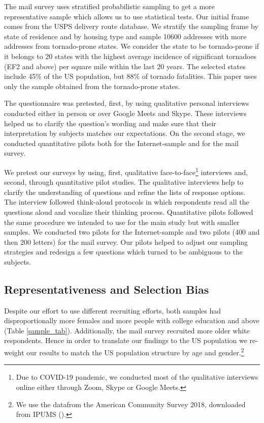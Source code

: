 \documentclass{ametsocV6.1}
\begin{document}
\label{sample_tab}

The mail survey uses stratified probabilistic sampling to get a more representative sample which allows us to use statistical tests. Our initial frame comes from the USPS delivery route database. We stratify the sampling frame by state of residence and by housing type and sample 10600 addresses with more addresses from tornado-prone states. We consider the state to be tornado-prone if it belongs to 20 states with the highest average incidence of significant tornadoes (EF2 and above) per square mile within the last 20 years.  The selected states include 45\% of the US population, but 88\% of tornado fatalities. This paper uses only the sample obtained from the tornado-prone states.

The questionnaire was pretested, first, by using qualitative personal  interviews conducted either in person or over Google Meets and Skype. These interviews helped us to clarify the question's wording and make sure that their interpretation by subjects matches our expectations. On the second stage, we conducted quantitative pilots both for the Internet-sample and for the mail survey.

We pretest our surveys by using, first, qualitative face-to-face\footnote{Due to COVID-19 pandemic, we conducted most of the qualitative interviews online either through Zoom, Skype or Google Meets.} interviews and, second, through quantitative pilot studies. The qualitative interviews help to clarify the understanding of questions and refine the lists of response options. The interview followed think-aloud protocols \citep{dillman_internet_2008} in which respondents  read all the questions aloud and vocalize their thinking process. Quantitative pilots followed the same procedure we intended to use for the main study but with smaller samples. We conducted two pilots for the Internet-sample and two pilots (400 and then 200 letters) for the mail survey. Our pilots helped to adjust our sampling strategies and redesign a few questions which turned to be ambiguous to the subjects.

\vspace{10pt}
\subsection{Representativeness and Selection Bias} 
Despite our effort to use different recruiting efforts, both samples had disproportionally more females and more people with college education and above (Table \ref{sample_tab}). Additionally, the mail survey recruited more older white respondents. Hence in order to translate our findings to the US population we re-weight our results to match the US population structure by age and gender.\footnote{We use the datafrom the American Community Survey 2018, downloaded from IPUMS (\citet{ruggles_ipums_2021}).}
\end{document}

